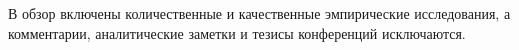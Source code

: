 \documentclass[%
]{report}
\begin{document}
В обзор включены количественные и качественные эмпирические исследования,
а комментарии, аналитические заметки и тезисы конференций исключаются.



\end{document}
